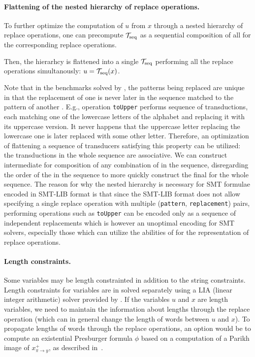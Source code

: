 \paragraph{Flattening of the nested hierarchy of replace operations.}
To further optimize the computation of $u$ from $x$ through a nested hierarchy of replace operations, one can precompute $\mathcal{T}_\text{seq}$ as a sequential composition of all \nfts for the corresponding replace operations.

Then, the hierarhcy is flattened into a single $\mathcal{T}_\text{seq}$ performing all the replace operations simultanously: $u = \mathcal{T}_\text{seq}(x)$.

Note that in the benchmarks solved by \noodler, the patterns being replaced are unique in that the replacement of one \nft is never later in the sequence matched to the pattern of another \nft.
E.g., operation \texttt{toUpper} performs sequence of transductions, each matching one of the lowercase letters of the alphabet and replacing it with its uppercase version.
It never happens that the uppercase letter replacing the lowercase one is later replaced with some other letter.
Therefore, an optimization of flattening a sequence of transducers satisfying this property can be utilized: the transductions in the whole sequence are associative.
We can construct intermediate \nfts for composition of any combination of \nfts in the sequence, disregarding the order of the \nfts in the sequence to more quickly construct the final \nfts for the whole sequence.
The reason for why the nested hierarchy is necessary for SMT formulae encoded in SMT-LIB format is that since the SMT-LIB format does not allow specifying a single replace operation with multiple (\texttt{pattern}, \texttt{replacement}) pairs, performing operations such as \texttt{toUpper} can be encoded only as a sequence of independent replacements which is however an unoptimal encoding for SMT solvers, especially those which can utilize the abilities of \nfts for the representation of replace operations.

\paragraph{Length constraints.}
Some variables may be length constrainted in addition to the string constraints.
Length constraints for variables are in \noodler solved separately using a LIA (linear integer arithmetic) solver provided by \ziii.
If the variables $u$ and $x$ are length variables, we need to maintain the information about lengths through the replace operation (which can in general change the length of words between $u$ and $x$).
To propagate lengths of words through the replace operations, an option would be to compute an existential Presburger formula $\phi$ based on a computation of a Parikh image of $x^{+}_{\pi \rightarrow y}$, as described in~\cite{ChainFree}.

